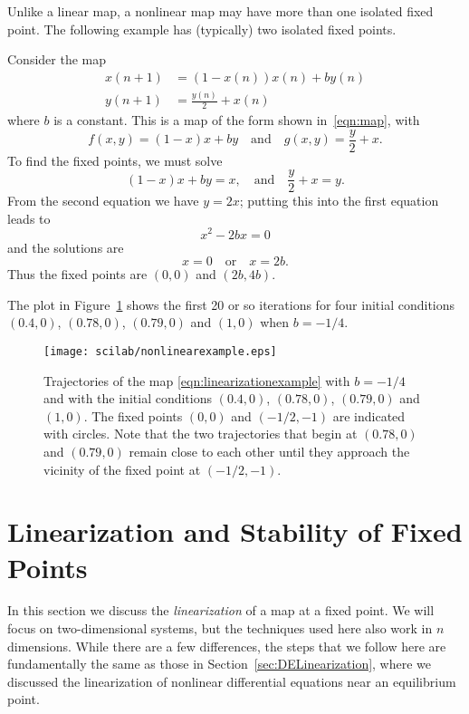 Unlike a linear map, a nonlinear map may have more than
one isolated fixed point.  The following example
has (typically) two isolated fixed points.
%
\begin{xexample}
Consider the map
\begin{equation}
\begin{split}
  x(n+1) & = (1- x(n))x(n) + b y(n) \\
  y(n+1) & = \frac{y(n)}{2} + x(n)
\end{split}
\label{eqn:linearizationexample}
\end{equation}
where $b$ is a constant.
This is a map of the form shown in~\eqref{eqn:map}, with
\begin{equation}
   f(x,y) = (1-x)x+by \quad \textrm{and} \quad g(x,y) = \frac{y}{2}+x.
\end{equation}
To find the fixed points, we must solve
\begin{equation}
   (1 - x)x + by = x, \quad \textrm{and} \quad \frac{y}{2}+x = y.
\end{equation}
From the second equation we have $y = 2x$; putting this into the first equation
leads to
\begin{equation}
   x^2-2bx = 0
\end{equation}
and the solutions are
\begin{equation}
  x = 0 \quad \textrm{or} \quad x= 2b.
\end{equation}
Thus the fixed points are
$(0,0)$ and $(2b,4b)$.

The plot in Figure~\ref{fig:nonlinearexample}
shows the first 20 or so iterations for four
initial conditions $(0.4,0)$, $(0.78,0)$,
$(0.79,0)$ and $(1,0)$ when $b=-1/4$.
\begin{figure}
\centerline{%
\texttt{[image: scilab/nonlinearexample.eps]}
}
\caption{Trajectories of the map
\eqref{eqn:linearizationexample} with
$b=-1/4$ and with the initial conditions
$(0.4,0)$, $(0.78,0)$,
$(0.79,0)$ and $(1,0)$.
The fixed points $(0,0)$ and $(-1/2,-1)$ are indicated
with circles.
Note that the two trajectories that begin at
$(0.78,0)$ and $(0.79,0)$ remain close to each other
until they approach the vicinity of the
fixed point at $(-1/2,-1)$.
}
\label{fig:nonlinearexample}
\end{figure}
\end{xexample}
%
\newpage
%
\section{Linearization and Stability of Fixed Points}
%
In this section we discuss the \emph{linearization}
of a map at a fixed point. 
We will focus on two-dimensional systems, but the
techniques used here also work in $n$ dimensions.
While there are a few differences, the steps that
we follow here are fundamentally the same as those
in Section~\ref{sec:DELinearization}, where we discussed
the linearization of nonlinear differential equations
near an equilibrium point.

